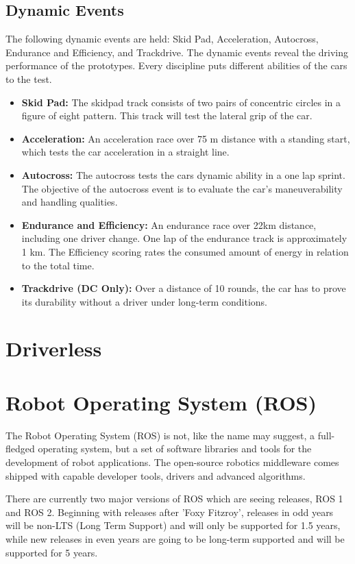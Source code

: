 \subsection{Dynamic Events}
The following dynamic events are held: Skid Pad, Acceleration, Autocross, Endurance and Efficiency, and Trackdrive.
The dynamic events reveal the driving performance of the prototypes. Every discipline puts different abilities of the cars to the test.

\begin{itemize}
    \item \textbf{Skid Pad:} The skidpad track consists of two pairs of concentric circles in a figure of eight pattern. This track will test the lateral grip of the car.
    \item \textbf{Acceleration:} An acceleration race over 75 m distance with a standing start, which tests the car acceleration in a straight line.
    \item \textbf{Autocross:} The autocross tests the cars dynamic ability in a one lap sprint. The objective of the autocross event is to evaluate the car's maneuverability and handling qualities.
    \item \textbf{Endurance and Efficiency:} An endurance race over 22km distance, including one driver change. One lap of the endurance track is approximately 1 km. The Efficiency scoring rates the consumed amount of energy in relation to the total time.
    \item \textbf{Trackdrive (DC Only):}  Over a distance of 10 rounds, the car has to prove its durability without a driver under long-term conditions.
\end{itemize}

\section{Driverless}
\lipsum[1]

\section{Robot Operating System (ROS)}
The Robot Operating System (ROS) is not, like the name may suggest, a full-fledged operating system, but a set of software libraries and tools for the development of robot applications. The open-source robotics middleware comes shipped with capable developer tools, drivers and advanced algorithms. \cite{ros2_documentation}

There are currently two major versions of ROS which are seeing releases, ROS 1 and ROS 2. \cite{ros2_distributions} Beginning with releases after 'Foxy Fitzroy', releases in odd years will be non-LTS (Long Term Support) and will only be supported for 1.5 years, while new releases in even years are going to be long-term supported and will be supported for 5 years. \cite{ros2_releases_and_target_platforms}

